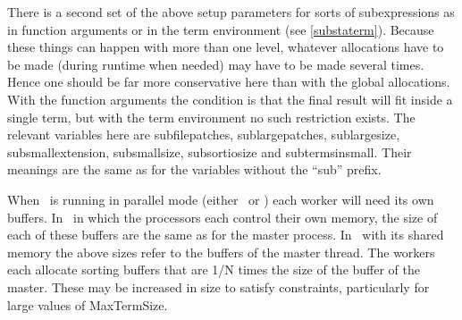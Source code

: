 




There is a second set of the above setup parameters for sorts of 
subexpressions as in function arguments or in the 
term environment (see \ref{substaterm}). Because these things can happen 
with more than one level, whatever allocations have to be made (during 
runtime when needed) may have to be made several times. Hence one should be 
far more conservative here than with the global allocations.
With the function arguments 
the condition is that the final result will fit inside a single term, but 
with the term environment no such restriction exists. The relevant 
variables here are subfilepatches, sublargepatches, sublargesize, 
subsmallextension, subsmallsize, subsortiosize and subtermsinsmall. Their 
meanings are the same as for the variables without the ``sub'' prefix.

When \FORM\ is running in parallel mode (either \TFORM\ or \ParFORM) each worker 
will need its own buffers. In \ParFORM\ in which the processors each control 
their own memory, the size of each of these buffers are the same as for the 
master process. In \TFORM\ with its shared memory the above sizes refer to 
the buffers of the master thread. The workers each allocate sorting buffers
that are 1/N times the size of the buffer of the master. These may be increased
in size to satisfy constraints, particularly for large values of MaxTermSize.


